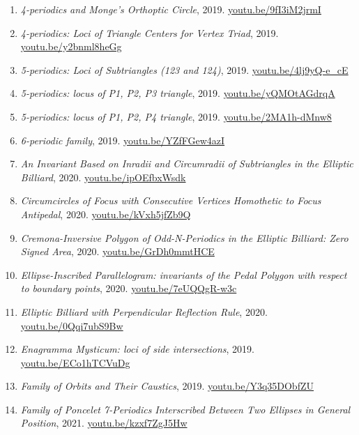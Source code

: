 \documentclass[12pt]{article}
\begin{document}
\begin{enumerate}[resume]
\item \textit{4-periodics and Monge's Orthoptic Circle}, 2019. \href{https://youtu.be/9fI3iM2jrmI}{\url{youtu.be/9fI3iM2jrmI}}
\item \textit{4-periodics: Loci of Triangle Centers for Vertex Triad}, 2019. \href{https://youtu.be/y2bnml8heGg}{\url{youtu.be/y2bnml8heGg}}
\item \textit{5-periodics: Loci of Subtriangles (123 and 124)}, 2019. \href{https://youtu.be/4lj9yQ-e_cE}{\url{youtu.be/4lj9yQ-e\_cE}}
\item \textit{5-periodics: locus of P1, P2, P3 triangle}, 2019. \href{https://youtu.be/yQMOtAGdrqA}{\url{youtu.be/yQMOtAGdrqA}}
\item \textit{5-periodics: locus of P1, P2, P4 triangle}, 2019. \href{https://youtu.be/2MA1h-dMnw8}{\url{youtu.be/2MA1h-dMnw8}}
\item \textit{6-periodic family}, 2019. \href{https://youtu.be/YZfFGew4azI}{\url{youtu.be/YZfFGew4azI}}
\item \textit{An Invariant Based on Inradii and Circumradii of Subtriangles in the Elliptic Billiard}, 2020. \href{https://youtu.be/ipOEfbxWsdk}{\url{youtu.be/ipOEfbxWsdk}}
\item \textit{Circumcircles of Focus with Consecutive Vertices Homothetic to Focus Antipedal}, 2020. \href{https://youtu.be/kVxh5jfZb9Q}{\url{youtu.be/kVxh5jfZb9Q}}
\item \textit{Cremona-Inversive Polygon of Odd-N-Periodics in the Elliptic Billiard: Zero Signed Area}, 2020. \href{https://youtu.be/GrDh0mmtHCE}{\url{youtu.be/GrDh0mmtHCE}}
\item \textit{Ellipse-Inscribed Parallelogram: invariants of the Pedal Polygon with respect to boundary points}, 2020. \href{https://youtu.be/7eUQQgR-w3c}{\url{youtu.be/7eUQQgR-w3c}}
\item \textit{Elliptic Billiard with Perpendicular Reflection Rule}, 2020. \href{https://youtu.be/0Qqi7ubS9Bw}{\url{youtu.be/0Qqi7ubS9Bw}}
\item \textit{Enagramma Mysticum: loci of side intersections}, 2019. \href{https://youtu.be/ECo1hTCVuDg}{\url{youtu.be/ECo1hTCVuDg}}
\item \textit{Family of Orbits and Their Caustics}, 2019. \href{https://youtu.be/Y3q35DObfZU}{\url{youtu.be/Y3q35DObfZU}}
\item \textit{Family of Poncelet 7-Periodics Interscribed Between Two Ellipses in General Position}, 2021. \href{https://youtu.be/kzxf7ZgJ5Hw}{\url{youtu.be/kzxf7ZgJ5Hw}}

\end{enumerate}
\end{document}
